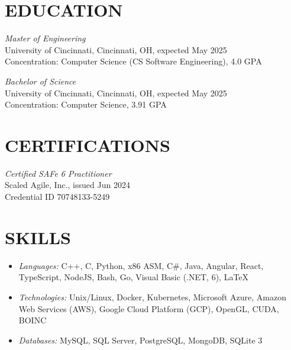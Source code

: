 \documentclass[margin]{res} %
\begin{document}
\begin{resume}
\section{EDUCATION}

{\sl Master of Engineering }\\
University of Cincinnati, Cincinnati, OH, expected May 2025 \\
Concentration: Computer Science (CS Software Engineering), 4.0 GPA

\vspace*{-1.5mm}

{\sl Bachelor of Science}\\
University of Cincinnati, Cincinnati, OH, expected May 2025 \\
Concentration: Computer Science, 3.91 GPA


\section{CERTIFI\-CATIONS}

{\sl Certified SAFe\textsuperscript{\tiny\textregistered} 6 Practitioner}\\
Scaled Agile, Inc., issued Jun 2024\\
Credential ID 70748133-5249


\section{SKILLS}

\begin{itemize}[leftmargin=0cm, label={}]
    \item {\sl Languages:} 
    C++, C, Python, x86 ASM, C\#, Java, Angular, React, TypeScript, NodeJS, Bash, Go, Visual Basic (.NET, 6), \LaTeX
    \item {\sl Technologies:} 
    Unix/Linux, Docker, Kubernetes, Microsoft Azure, Amazon Web Services (AWS), Google Cloud Platform (GCP), OpenGL, CUDA, BOINC
    \item {\sl Databases:} 
    MySQL, SQL Server, PostgreSQL, MongoDB, SQLite 3
\end{itemize}


\end{resume}
\end{document}
